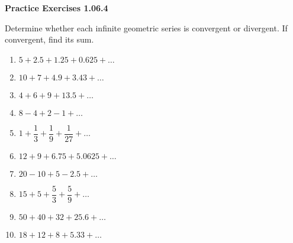 \vspace{0.3ex}
\noindent\textbf{Practice Exercises 1.06.4}

\vspace{0.2ex}

Determine whether each infinite geometric series is convergent or divergent. If convergent, find its sum.
\begin{multicols}{2}
\begin{enumerate}
    \item \( 5 + 2.5 + 1.25 + 0.625 + \dots \)
    \item \( 10 + 7 + 4.9 + 3.43 + \dots \)
    \item \( 4 + 6 + 9 + 13.5 + \dots \)
    \item \( 8 - 4 + 2 - 1 + \dots \)
    \item \( 1 + \dfrac{1}{3} + \dfrac{1}{9} + \dfrac{1}{27} + \dots \)
    \item \( 12 + 9 + 6.75 + 5.0625 + \dots \)
    \item \( 20 - 10 + 5 - 2.5 + \dots \)
    \item \( 15 + 5 + \dfrac{5}{3} + \dfrac{5}{9} + \dots \)
    \item \( 50 + 40 + 32 + 25.6 + \dots \)
    \item \( 18 + 12 + 8 + 5.33 + \dots \)
\end{enumerate}
\end{multicols}
